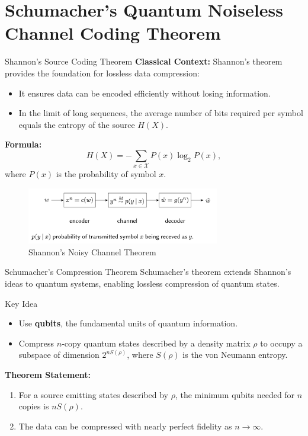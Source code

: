 \section{Schumacher's Quantum Noiseless Channel Coding Theorem}

\begin{frame}{Shannon's Source Coding Theorem}
    \textbf{Classical Context:} Shannon's theorem provides the foundation for lossless data compression:
    \begin{itemize}
        \item It ensures data can be encoded efficiently without losing information.
        \item In the limit of long sequences, the average number of bits required per symbol equals the entropy of the source \( H(X) \).
    \end{itemize}
    \textbf{Formula:}
    \[
    H(X) = -\sum_{x \in \mathcal{X}} P(x) \log_2 P(x),
    \]
    where \( P(x) \) is the probability of symbol \( x \).
    \begin{figure}[h]
        \centering
        \includegraphics[width=0.75\textwidth]{figures/shannon_pic.png}
        \caption{Shannon's Noisy Channel Theorem \cite{jahooShannonsNoisy}}
    \end{figure}
\end{frame}

\begin{frame}{Schumacher's Compression Theorem}
    Schumacher's theorem extends Shannon's ideas to quantum systems, enabling lossless compression of quantum states.
    \begin{block}{Key Idea}
        \begin{itemize}
            \item Use \textbf{qubits}, the fundamental units of quantum information.
            \item Compress \( n \)-copy quantum states described by a density matrix \( \rho \) to occupy a subspace of dimension \( 2^{n S(\rho)} \), where \( S(\rho) \) is the von Neumann entropy.
        \end{itemize}
    \end{block}
    \textbf{Theorem Statement:}
    \begin{enumerate}
        \item For a source emitting states described by \( \rho \), the minimum qubits needed for \( n \) copies is \( n S(\rho) \).
        \item The data can be compressed with nearly perfect fidelity as \( n \to \infty \).
    \end{enumerate}
\end{frame}

